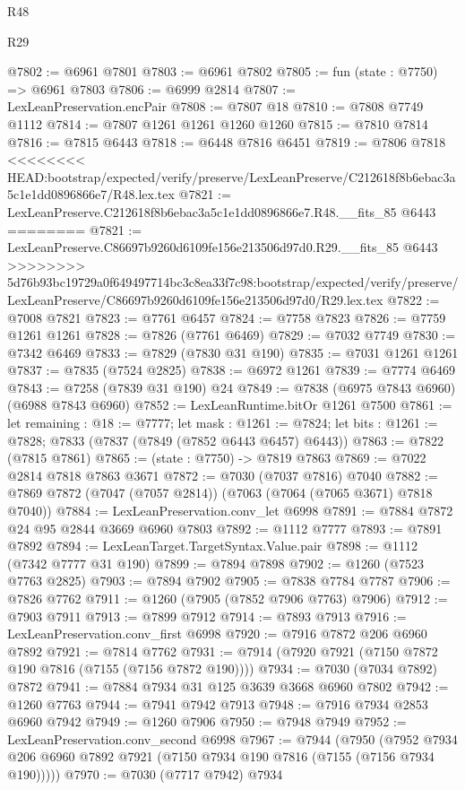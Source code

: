 \begin{lexlean}{R48}
\begin{lexlean}{R29}
\begin{coremodule}
{{{{{{{{{{{{{{{{{{{{{{{{{{{{{{{{{{{{{{{{{{{{{{{{{{{{{{{{{{{{{{{{{{{{{{{{{{{{{{{{{{{{{{{{{{{{{{{{{{{{{{{{{{{{{{{{{{{{{{{{{{{{{{{{{{{{{{{{{{{{{{{{{{{{{{{{{{{{{{{{{{{{{{{{{{{{{{{{{{{{{{{{{{{{{{{{{{{{{{{{{{{{{{{{{{{{{{{{{{@7802 := @6961 @7801
@7803 := @6961 @7802
@7805 := fun (state : @7750) => @6961 @7803
@7806 := @6999 @2814
@7807 := LexLeanPreservation.encPair
@7808 := @7807 @18
@7810 := @7808 @7749 @1112
@7814 := @7807 @1261 @1261 @1260 @1260
@7815 := @7810 @7814
@7816 := @7815 @6443
@7818 := @6448 @7816 @6451
@7819 := @7806 @7818
<<<<<<<< HEAD:bootstrap/expected/verify/preserve/LexLeanPreserve/C212618f8b6ebac3a5c1e1dd0896866e7/R48.lex.tex
@7821 := LexLeanPreserve.C212618f8b6ebac3a5c1e1dd0896866e7.R48.__fits_85 @6443
========
@7821 := LexLeanPreserve.C86697b9260d6109fe156e213506d97d0.R29.__fits_85 @6443
>>>>>>>> 5d76b93bc19729a0f649497714bc3c8ea33f7c98:bootstrap/expected/verify/preserve/LexLeanPreserve/C86697b9260d6109fe156e213506d97d0/R29.lex.tex
@7822 := @7008 @7821
@7823 := @7761 @6457
@7824 := @7758 @7823
@7826 := @7759 @1261 @1261
@7828 := @7826 (@7761 @6469)
@7829 := @7032 @7749
@7830 := @7342 @6469
@7833 := @7829 (@7830 @31 @190)
@7835 := @7031 @1261 @1261
@7837 := @7835 (@7524 @2825)
@7838 := @6972 @1261
@7839 := @7774 @6469
@7843 := @7258 (@7839 @31 @190) @24
@7849 := @7838 (@6975 @7843 @6960) (@6988 @7843 @6960)
@7852 := LexLeanRuntime.bitOr @1261 @7500
@7861 := let remaining : @18 := @7777;
  let mask : @1261 := @7824;
  let bits : @1261 := @7828; @7833 (@7837 (@7849 (@7852 @6443 @6457) @6443))
@7863 := @7822 (@7815 @7861)
@7865 := (state : @7750) -> @7819 @7863
@7869 := @7022 @2814 @7818 @7863 @3671
@7872 := @7030 (@7037 @7816) @7040
@7882 := @7869 @7872 (@7047 (@7057 @2814)) (@7063 (@7064 (@7065 @3671) @7818 @7040))
@7884 := LexLeanPreservation.conv_let @6998
@7891 := @7884 @7872 @24 @95 @2844 @3669 @6960 @7803
@7892 := @1112 @7777
@7893 := @7891 @7892
@7894 := LexLeanTarget.TargetSyntax.Value.pair
@7898 := @1112 (@7342 @7777 @31 @190)
@7899 := @7894 @7898
@7902 := @1260 (@7523 @7763 @2825)
@7903 := @7894 @7902
@7905 := @7838 @7784 @7787
@7906 := @7826 @7762
@7911 := @1260 (@7905 (@7852 @7906 @7763) @7906)
@7912 := @7903 @7911
@7913 := @7899 @7912
@7914 := @7893 @7913
@7916 := LexLeanPreservation.conv_first @6998
@7920 := @7916 @7872 @206 @6960 @7892
@7921 := @7814 @7762
@7931 := @7914 (@7920 @7921 (@7150 @7872 @190 @7816 (@7155 (@7156 @7872 @190))))
@7934 := @7030 (@7034 @7892) @7872
@7941 := @7884 @7934 @31 @125 @3639 @3668 @6960 @7802
@7942 := @1260 @7763
@7944 := @7941 @7942 @7913
@7948 := @7916 @7934 @2853 @6960 @7942
@7949 := @1260 @7906
@7950 := @7948 @7949
@7952 := LexLeanPreservation.conv_second @6998
@7967 := @7944
    (@7950 (@7952 @7934 @206 @6960 @7892 @7921 (@7150 @7934 @190 @7816 (@7155 (@7156 @7934 @190)))))
@7970 := @7030 (@7717 @7942) @7934
}}}}}}}}}}}}}}}}}}}}}}}}}}}}}}}}}}}}}}}}}}}}}}}}}}}}}}}}}}}}}}}}}}}}}}}}}}}}}}}}}}}}}}}}}}}}}}}}}}}}}}}}}}}}}}}}}}}}}}}}}}}}}}}}}}}}}}}}}}}}}}}}}}}}}}}}}}}}}}}}}}}}}}}}}}}}}}}}}}}}}}}}}}}}}}}}}}}}}}}}}}}}}}}}}}}}}}}}}}
\end{coremodule}
\end{lexlean}
\end{lexlean}
